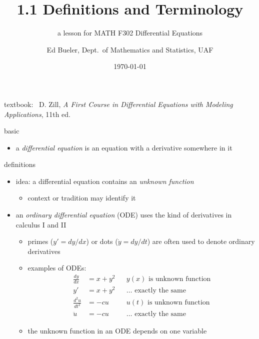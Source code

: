 \documentclass{beamer}
\title{1.1 Definitions and Terminology}
\subtitle{a lesson for MATH F302 Differential Equations}
\date{\today}
\author{Ed Bueler, Dept.~of Mathematics and Statistics, UAF}
\begin{document}


\begin{frame}
\titlepage

\centerline{\tiny textbook: \, D. Zill, \emph{A First Course in Differential Equations with Modeling Applications}, 11th ed.}
\end{frame}

\begin{frame}{basic}

\begin{itemize}
\item a \emph{differential equation} is an equation with a derivative somewhere in it
\end{itemize}
\end{frame}

\begin{frame}{definitions}

\begin{itemize}
\item idea: a differential equation contains an \emph{unknown function}
    \begin{itemize}
    \item context or tradition may identify it
    \end{itemize}
\item an \emph{ordinary differential equation} (ODE) uses the kind of derivatives in calculus I and II
    \begin{itemize}
    \item primes ($y' = dy/dx$) or dots ($\dot y = dy/dt$) are often used to denote ordinary derivatives
    \item examples of ODEs:
\begin{align*}
\frac{dy}{dx} &= x + y^2 && y(x) \text{ is unknown function} \\
y' &= x + y^2 && \dots \text{ exactly the same} \\
\frac{d^2 u}{dt^2} &= - c u && u(t) \text{ is unknown function} \\
\ddot u &= - c u && \dots \text{ exactly the same}
\end{align*}
    \item the unknown function in an ODE depends on one variable
    \end{itemize}
\end{itemize}
\end{frame}
\end{document}
